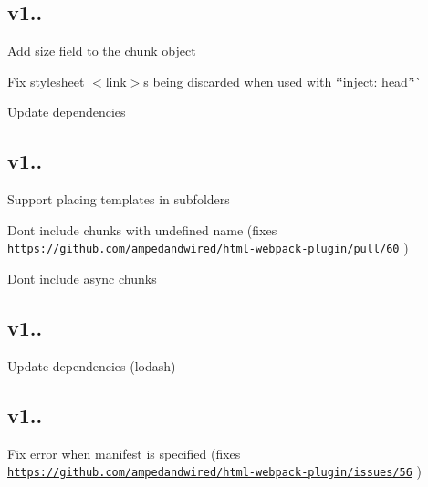 \subsection*{v1.. }


\begin{DoxyItemize}
\item Add {\ttfamily size} field to the chunk object
\item Fix stylesheet {\ttfamily $<$link$>$}s being discarded when used with `\char`\"{}inject\+: \textquotesingle{}head'\char`\"{}\`{}
\item Update dependencies
\end{DoxyItemize}

\subsection*{v1.. }


\begin{DoxyItemize}
\item Support placing templates in subfolders
\item Don\textquotesingle{}t include chunks with undefined name (fixes \href{https://github.com/ampedandwired/html-webpack-plugin/pull/60}{\tt https\+://github.\+com/ampedandwired/html-\/webpack-\/plugin/pull/60} )
\item Don\textquotesingle{}t include async chunks
\end{DoxyItemize}

\subsection*{v1.. }


\begin{DoxyItemize}
\item Update dependencies (lodash)
\end{DoxyItemize}

\subsection*{v1.. }


\begin{DoxyItemize}
\item Fix error when manifest is specified (fixes \href{https://github.com/ampedandwired/html-webpack-plugin/issues/56}{\tt https\+://github.\+com/ampedandwired/html-\/webpack-\/plugin/issues/56} )
\end{DoxyItemize}

